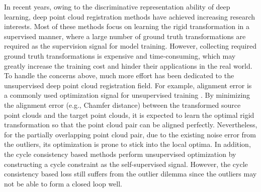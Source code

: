 \documentclass[letterpaper]{article} %
\begin{document}
	In recent years, owing to the discriminative representation ability of deep learning, deep point cloud registration methods have achieved increasing research interests.
	Most of these methods \cite{pais20203dregnet,fu2021robust, ali2021rpsrnet} focus on learning the rigid transformation in a supervised manner, where a large number of ground truth transformations are required as the supervision signal for model training.
	However, collecting required ground truth transformations is expensive and time-consuming, which may greatly increase the training cost and hinder their applications in the real world.
	To handle the concerns above, much more effort has been dedicated to the unsupervised deep point cloud registration field.
	For example, alignment error is a commonly used optimization signal for unsupervised training \cite{wang2020unsupervised}.
	By minimizing the alignment error (e.g., Chamfer distance) between the transformed source point clouds and the target point clouds, it is expected to learn the optimal rigid transformation so that the point cloud pair can be aligned perfectly.
	Nevertheless, for the partially overlapping point cloud pair, due to the existing noise error from the outliers, its optimization is prone to stick into the local optima.
	In addition, the cycle consistency based methods \cite{yang2020mapping} perform unsupervised optimization by constructing a cycle constraint as the self-supervised signal.
	However, the cycle consistency based loss still suffers from the outlier dilemma since the outliers may not be able to form a closed loop well.
\end{document}
